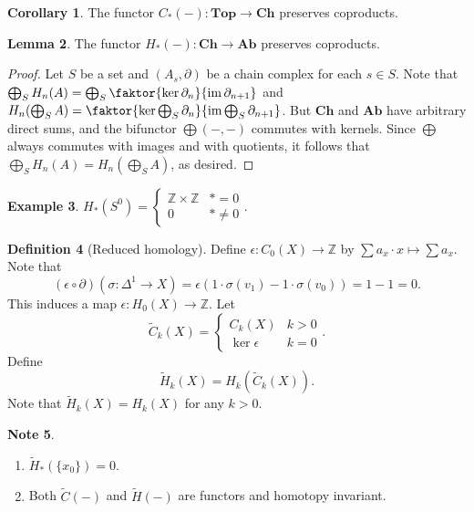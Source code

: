 \documentclass[10pt,letterpaper,cm]{nupset}
\theoremstyle{definition}
\newtheorem{definition}{Definition}[subsection]
\newtheorem{exmp}[definition]{Example}
\newtheorem{note}[definition]{Note}
\theoremstyle{theorem}
\newtheorem{lemma}[definition]{Lemma}
\newtheorem{corollary}[definition]{Corollary}
\theoremstyle{remark}
\newcommand{\Z}{\mathbb Z}
\newcommand{\1}{\mathbb{1}}
\newcommand{\0}{\vec 0}
\DeclareMathOperator{\im}{im}
\begin{document}
\begin{corollary}
The functor $C_{\ast}(-) : \mathbf{Top} \to \mathbf{Ch}$ preserves coproducts. 
\end{corollary}

\begin{lemma}
The functor $H_{\ast}(-) : \mathbf{Ch} \to \mathbf{Ab}$ preserves coproducts. 
\end{lemma}
\begin{proof}
Let $S$ be a set and $(A_s, \partial)$ be a chain complex for each $s\in S$. Note that $\bigoplus_S H_n(A) = \bigoplus_S \faktor{\ker{\partial_n}}{\im{\partial_{n+1}}}$ and $H_n(\bigoplus_S A) = \faktor{\ker{\bigoplus_S \partial_n}}{\im{\bigoplus_S \partial_{n+1}}}$. But $\mathbf{Ch}$ and $\mathbf{Ab}$ have arbitrary direct sums, and the bifunctor $\bigoplus (-,-)$ commutes with kernels. Since $\bigoplus$ always commutes with images and with quotients, it follows that $\bigoplus_S H_n(A) = H_n(\bigoplus_S A)$, as desired. 
\end{proof}


\begin{exmp}
$H_{\ast}(S^0) = \begin{cases} \Z \times \Z & \ast = 0 \\ 0 & \ast \ne 0 \end{cases}.$
\end{exmp}

\begin{definition}[Reduced homology]
Define $\epsilon :C_0(X) \to \Z$ by $\sum a_x \cdot x \mapsto \sum a_x$. Note that $$(\epsilon \circ \partial)(\sigma : \Delta^1 \to X) = \epsilon(1 \cdot \sigma(v_1) - 1 \cdot \sigma(v_0)) = 1-1 =0.$$ This induces a map $\epsilon : H_0(X) \to \Z$. Let $$\widetilde{C}_k(X) = \begin{cases} C_k(X) & k >0 \\ \ker{\epsilon} & k =0 \end{cases}.$$ Define $$\widetilde{H}_k(X) = H_k(\widetilde{C}_k(X)).$$ Note that $\widetilde{H}_k(X) = H_k(X)$ for any $k>0$.
\end{definition}

\begin{note} $ $
\begin{enumerate}
\item $\widetilde{H}_{\ast}(\{x_0\}) =0$.
\item Both $\widetilde{C}(-)$ and $\widetilde{H}(-)$ are functors and homotopy invariant.
\end{enumerate}
\end{note}
\end{document}
